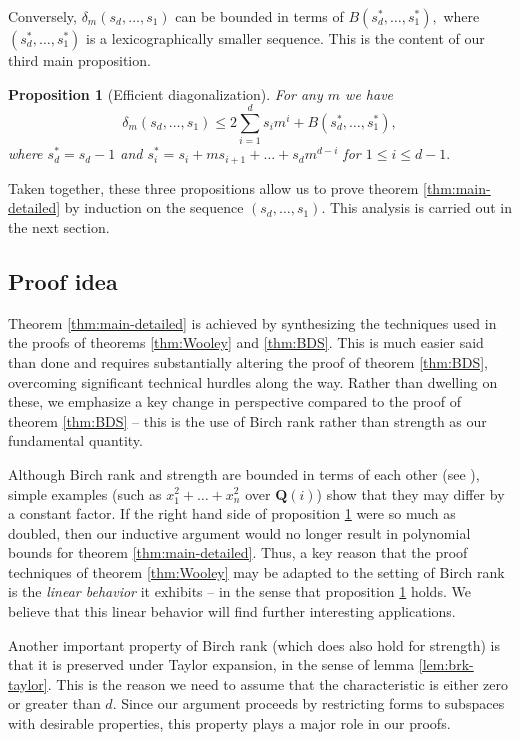 \documentclass[12pt]{amsart}
\newtheorem{proposition}[theorem]{Proposition}
\theoremstyle{definition}
\newcommand{\Q}{\mathbf{Q}}
\begin{document}
Conversely, $\delta_m(s_d,\ldots,s_1)$ can be bounded in terms of $B(s_d^*,\ldots,s_1^*),$ where $(s_d^*,\ldots,s_1^*)$ is a lexicographically smaller sequence. This is the content of our third main proposition.

\begin{proposition}[Efficient diagonalization]\label{prop:diag}
    For any $m$ we have 
    \[
    \delta_m(s_d,\ldots,s_1) \le 2\sum_{i=1}^d s_im^i+B(s^*_d,\ldots,s^*_1),
    \]
    where $s^*_d = s_d-1$ and $s^*_i = s_i+ms_{i+1}+\ldots+s_dm^{d-i}$ for $1\le i\le d-1.$ 
\end{proposition}



Taken together, these three propositions allow us to prove theorem \ref{thm:main-detailed} by induction on the sequence $(s_d,\ldots,s_1).$ This analysis is carried out in the next section.



\subsection{Proof idea} Theorem \ref{thm:main-detailed} is achieved by synthesizing the techniques used in the proofs of theorems \ref{thm:Wooley} and \ref{thm:BDS}. This is much easier said than done and requires substantially altering the proof of theorem  \ref{thm:BDS}, overcoming significant technical hurdles along the way. Rather than dwelling on these,  we emphasize a key change in perspective compared to the proof of theorem \ref{thm:BDS} -- this is the use of Birch rank rather than strength as our fundamental quantity. 

Although Birch rank and strength are bounded in terms of each other (see \cite{BDS-strength,BL, BDLZ}), simple examples (such as $x_1^2+\ldots + x_n^2$ over $\Q(i)$) show that they may differ by a constant factor. If the right hand side of proposition \ref{prop:diag} were so much as doubled, then our inductive argument would no longer result in polynomial bounds for theorem \ref{thm:main-detailed}. Thus, a key reason that the proof techniques of theorem \ref{thm:Wooley} may be adapted to the setting of Birch rank is the \emph{linear behavior} it exhibits -- in the sense that proposition \ref{prop:diag} holds. We believe that this linear behavior will find further interesting applications.
  
Another important property of Birch rank (which does  also hold for strength) is that it is preserved under Taylor expansion, in the sense of lemma \ref{lem:brk-taylor}. This is the reason we need to assume that the characteristic is either zero or greater than $d.$ Since our argument proceeds by restricting forms to subspaces with desirable properties, this property plays a major role in our proofs.
\end{document}
